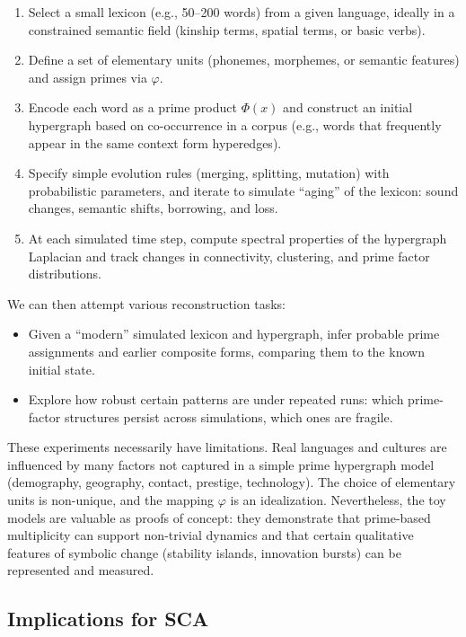 \documentclass[12]{amsart}
\theoremstyle{plain}
\begin{document}
\begin{enumerate}
  \item Select a small lexicon (e.g., 50--200 words) from a given language, ideally in a constrained semantic field (kinship terms, spatial terms, or basic verbs).
  \item Define a set of elementary units (phonemes, morphemes, or semantic features) and assign primes via $\varphi$.
  \item Encode each word as a prime product $\Phi(x)$ and construct an initial hypergraph based on co-occurrence in a corpus (e.g., words that frequently appear in the same context form hyperedges).
  \item Specify simple evolution rules (merging, splitting, mutation) with probabilistic parameters, and iterate to simulate ``aging'' of the lexicon: sound changes, semantic shifts, borrowing, and loss.
  \item At each simulated time step, compute spectral properties of the hypergraph Laplacian and track changes in connectivity, clustering, and prime factor distributions.
\end{enumerate}

We can then attempt various reconstruction tasks:

\begin{itemize}
  \item Given a ``modern'' simulated lexicon and hypergraph, infer probable prime assignments and earlier composite forms, comparing them to the known initial state.
  \item Explore how robust certain patterns are under repeated runs: which prime-factor structures persist across simulations, which ones are fragile.
\end{itemize}

These experiments necessarily have limitations. Real languages and cultures are influenced by many factors not captured in a simple prime hypergraph model (demography, geography, contact, prestige, technology). The choice of elementary units is non-unique, and the mapping $\varphi$ is an idealization. Nevertheless, the toy models are valuable as proofs of concept: they demonstrate that prime-based multiplicity can support non-trivial dynamics and that certain qualitative features of symbolic change (stability islands, innovation bursts) can be represented and measured.

\subsection{Implications for SCA}
\end{document}

